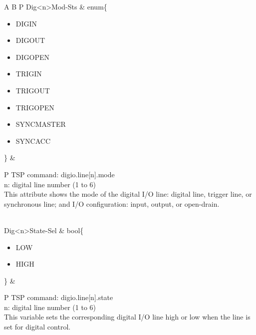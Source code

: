 \documentclass[openany]{article}
\begin{document}
\begin{longtable}{A B P}
		Dig{\textless n\textgreater}Mod-Sts & enum\{\begin{itemize}[noitemsep]
					\small
					\item[] DIGIN
					\item[] DIGOUT
					\item[] DIGOPEN
					\item[] TRIGIN
					\item[] TRIGOUT
					\item[] TRIGOPEN
					\item[] SYNCMASTER
					\item[] SYNCACC
				\end{itemize}\} & 
				\begin{tabular}{P}
					TSP command: digio.line[n].mode \\
					n: digital line number (1 to 6) \\
					This attribute shows the mode of the digital I/O line: digital line, trigger line, or synchronous line; and I/O configuration: input, output, or open-drain.
				\end{tabular} \\ \hline
		Dig{\textless n\textgreater}State-Sel & bool\{\begin{itemize}[noitemsep]
					\small
					\item[] LOW
					\item[] HIGH
				\end{itemize}\} & 
				\begin{tabular}{P}
					TSP command: digio.line[n].state \\
					n: digital line number (1 to 6) \\
					This variable sets the corresponding digital I/O line high or low when the line is set for digital control.
				\end{tabular} \\


\end{longtable}
\end{document}
